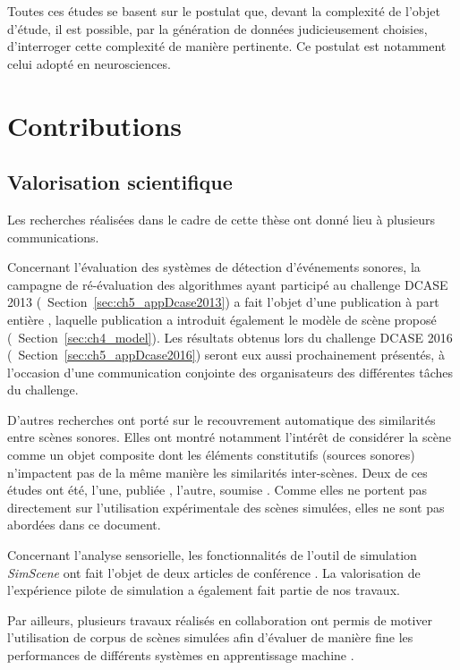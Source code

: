 Toutes ces études se basent sur le postulat que, devant la complexité de l'objet d'étude, il est possible, par la génération de données judicieusement choisies, d'interroger cette complexité de manière pertinente. Ce postulat est notamment celui adopté en neurosciences.

\section{Contributions}

\subsection{Valorisation scientifique}

Les recherches réalisées dans le cadre de cette thèse ont donné lieu à plusieurs communications.

Concernant l'évaluation des systèmes de détection d'événements sonores, la campagne de ré-évaluation des algorithmes ayant participé au challenge DCASE 2013 (\cf~Section~\ref{sec:ch5_appDcase2013}) a fait l'objet d'une publication à part entière \citep{lafay2016morphological}, laquelle publication a introduit également le modèle de scène proposé (\cf~Section~\ref{sec:ch4_model}). Les résultats obtenus lors du challenge DCASE 2016 (\cf~Section~\ref{sec:ch5_appDcase2016}) seront eux aussi prochainement présentés, à l'occasion d'une communication conjointe des organisateurs des différentes tâches du challenge.

D'autres recherches ont porté sur le recouvrement automatique des similarités entre scènes sonores. Elles ont montré notamment l'intérêt de considérer la scène comme un objet composite dont les éléments constitutifs (sources sonores) n'impactent pas de la même manière les similarités inter-scènes. Deux de ces études ont été, l'une, publiée \citep{lagrange2015bag}, l'autre, soumise \citep{Lostenlen2016ScatteringObjet}. Comme elles ne portent pas directement sur l'utilisation expérimentale des scènes simulées, elles ne sont pas abordées dans ce document.

Concernant l'analyse sensorielle, les fonctionnalités de l'outil de simulation \emph{SimScene} ont fait l'objet de deux articles de conférence  \citep{rossignol2015simscene,lafay2016JAES}. La valorisation de l'expérience pilote de simulation \citep{lafay2014new} a également fait partie de nos travaux.

Par ailleurs, plusieurs travaux réalisés en collaboration ont permis de motiver l'utilisation de corpus de scènes simulées afin d'évaluer de manière fine les performances de différents systèmes en apprentissage machine \citep{benetos2016detectionLDC,rossignol2015alternate,benetos2016detection}.

